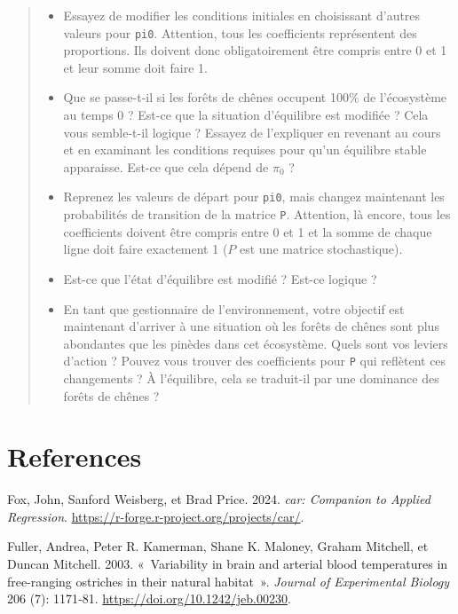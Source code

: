 \documentclass[
  french,
  a4paper,
  DIV=11,
  numbers=noendperiod,
  oneside]{scrreprt}
\newlength{\cslhangindent}
\newenvironment{CSLReferences}[2] %
 {\begin{list}{}{%
  \setlength{\itemindent}{0pt}
  \setlength{\leftmargin}{0pt}
  \setlength{\parsep}{0pt}
  \ifodd #1
   \setlength{\leftmargin}{\cslhangindent}
   \setlength{\itemindent}{-1\cslhangindent}
  \fi
  \setlength{\itemsep}{#2\baselineskip}}}
 {\end{list}}
\providecommand{\tightlist}{%
  \setlength{\itemsep}{0pt}\setlength{\parskip}{0pt}}
\begin{document}
\begin{tcolorbox}
\begin{quote}
\begin{itemize}
\tightlist
\item
  Essayez de modifier les conditions initiales en choisissant d'autres
  valeurs pour \texttt{pi0}. Attention, tous les coefficients
  représentent des proportions. Ils doivent donc obligatoirement être
  compris entre 0 et 1 et leur somme doit faire 1.
\item
  Que se passe-t-il si les forêts de chênes occupent 100\% de
  l'écosystème au temps 0 ? Est-ce que la situation d'équilibre est
  modifiée ? Cela vous semble-t-il logique ? Essayez de l'expliquer en
  revenant au cours et en examinant les conditions requises pour qu'un
  équilibre stable apparaisse. Est-ce que cela dépend de \(\pi_0\) ?
\item
  Reprenez les valeurs de départ pour \texttt{pi0}, mais changez
  maintenant les probabilités de transition de la matrice \texttt{P}.
  Attention, là encore, tous les coefficients doivent être compris entre
  0 et 1 et la somme de chaque ligne doit faire exactement 1 (\(P\) est
  une matrice stochastique).
\item
  Est-ce que l'état d'équilibre est modifié ? Est-ce logique ?
\item
  En tant que gestionnaire de l'environnement, votre objectif est
  maintenant d'arriver à une situation où les forêts de chênes sont plus
  abondantes que les pinèdes dans cet écosystème. Quels sont vos leviers
  d'action ? Pouvez vous trouver des coefficients pour \texttt{P} qui
  reflètent ces changements ? À l'équilibre, cela se traduit-il par une
  dominance des forêts de chênes ?
\end{itemize}
\end{quote}


\chapter*{References}\label{references}


\protect{}\label{refs}
\begin{CSLReferences}{1}{1}
Fox, John, Sanford Weisberg, et Brad Price. 2024. \emph{car: Companion
to Applied Regression}.
\url{https://r-forge.r-project.org/projects/car/}.

Fuller, Andrea, Peter R. Kamerman, Shane K. Maloney, Graham Mitchell, et
Duncan Mitchell. 2003. {«~Variability in brain and arterial blood
temperatures in free-ranging ostriches in their natural habitat~»}.
\emph{Journal of Experimental Biology} 206 (7): 1171‑81.
\url{https://doi.org/10.1242/jeb.00230}.


\end{CSLReferences}
\end{tcolorbox}
\end{document}
